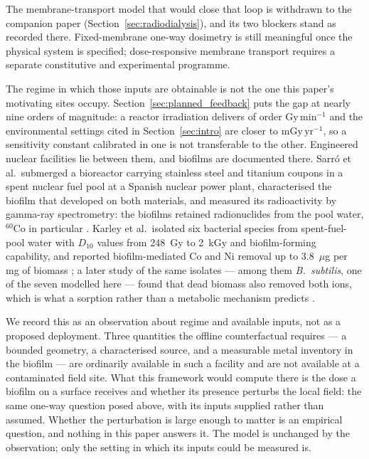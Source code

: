 \documentclass[11pt]{article}
\begin{document}
The membrane-transport model that would close that loop is withdrawn to the companion paper
(Section~\ref{sec:radiodialysis}), and its two blockers stand as recorded there. Fixed-membrane
one-way dosimetry is still meaningful once the physical system is specified; dose-responsive
membrane transport requires a separate constitutive and experimental programme.

The regime in which those inputs are obtainable is not the one this paper's motivating sites
occupy. Section~\ref{sec:planned_feedback} puts the gap at nearly nine orders of magnitude: a
reactor irradiation delivers of order $\mathrm{Gy}\,\mathrm{min}^{-1}$ and the environmental
settings cited in Section~\ref{sec:intro} are closer to $\mathrm{mGy}\,\mathrm{yr}^{-1}$, so a sensitivity
constant calibrated in one is not transferable to the other. Engineered nuclear facilities lie
between them, and biofilms are documented there. Sarr\'{o} et al.\ submerged a bioreactor
carrying stainless steel and titanium coupons in a spent nuclear fuel pool at a Spanish nuclear
power plant, characterised the biofilm that developed on both materials, and measured its
radioactivity by gamma-ray spectrometry: the biofilms retained radionuclides from the pool water,
$^{60}$Co in particular \cite{sarro2007}. Karley et al.\ isolated six bacterial species from
spent-fuel-pool water with $D_{10}$ values from 248~Gy to 2~kGy and biofilm-forming capability,
and reported biofilm-mediated Co and Ni removal up to 3.8~$\mu$g per mg of biomass
\cite{karley2018}; a later study of the same isolates --- among them \textit{B.\ subtilis}, one
of the seven modelled here --- found that dead biomass also removed both ions, which is what a
sorption rather than a metabolic mechanism predicts \cite{karley2023}.

We record this as an observation about regime and available inputs, not as a proposed deployment.
Three quantities the offline counterfactual requires --- a bounded geometry, a characterised
source, and a measurable metal inventory in the biofilm --- are ordinarily available in such a
facility and are not available at a contaminated field site. What this framework would compute
there is the dose a biofilm on a surface receives and whether its presence perturbs the local
field: the same one-way question posed above, with its inputs supplied rather than assumed.
Whether the perturbation is large enough to matter is an empirical question, and nothing in this
paper answers it. The model is unchanged by the observation; only the setting in which its inputs
could be measured is.
\end{document}
